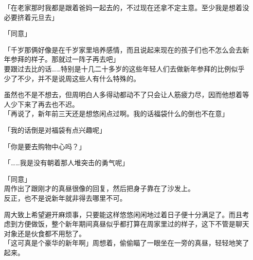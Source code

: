 「在老家那时我都是跟着爸妈一起去的，不过现在还拿不定主意。至少我是想着没必要挤着元旦去」

「同意」

「千岁那俩好像是在千岁家里培养感情，而且说起来现在的孩子们也不怎么会去新年参拜的样子。那就过一阵子再去吧」\\

要跟过去比的话……特别是十几二十多岁的这些年轻人们去做新年参拜的比例似乎少了不少，并不是说周这些人有什么特殊的。

虽然也不是不想去，但周明白人多得动都动不了只会让人筋疲力尽，因而他想着等人少下来了再去也不迟。\\

「再说了，新年前三天还是想悠闲点过啊。我的话福袋什么的倒也不在意」

「我的话倒是对福袋有点兴趣呢」

「你是要去购物中心吗？」

「……我是没有朝着那人堆突击的勇气呢」

「同意」\\

周作出了跟刚才的真昼很像的回复，然后把身子靠在了沙发上。\\

反正，也不是说新年就非得去哪里不可。

周大致上希望避开麻烦事，只要能这样悠悠闲闲地过着日子便十分满足了。而且考虑到方便做饭，整个新年期间真昼似乎都打算在周家里过的样子，这下不管是聊天对象还是伙食都不用愁了。\\

「这可真是个豪华的新年啊」周想着，偷偷瞄了一眼坐在一旁的真昼，轻轻地笑了起来。
